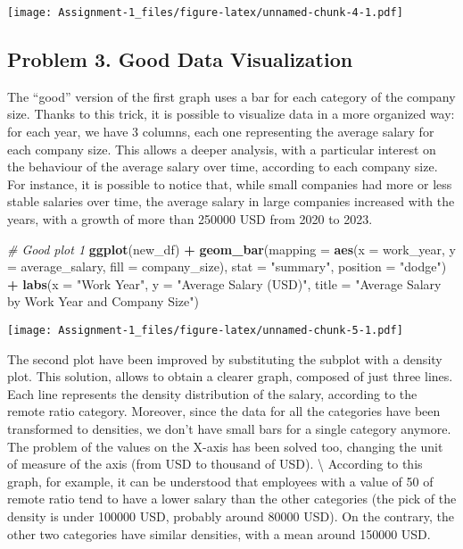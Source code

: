 \documentclass[
]{article}
\newenvironment{Shaded}{\begin{snugshade}}{\end{snugshade}}
\newcommand{\AttributeTok}[1]{\textcolor[rgb]{0.13,0.29,0.53}{#1}}
\newcommand{\CommentTok}[1]{\textcolor[rgb]{0.56,0.35,0.01}{\textit{#1}}}
\newcommand{\FunctionTok}[1]{\textcolor[rgb]{0.13,0.29,0.53}{\textbf{#1}}}
\newcommand{\NormalTok}[1]{#1}
\newcommand{\SpecialCharTok}[1]{\textcolor[rgb]{0.81,0.36,0.00}{\textbf{#1}}}
\newcommand{\StringTok}[1]{\textcolor[rgb]{0.31,0.60,0.02}{#1}}
\begin{document}
\texttt{[image: Assignment-1\_files/figure-latex/unnamed-chunk-4-1.pdf]}

\hypertarget{problem-3.-good-data-visualization}{%
\subsection{Problem 3. Good Data
Visualization}\label{problem-3.-good-data-visualization}}

The ``good'' version of the first graph uses a bar for each category of
the company size. Thanks to this trick, it is possible to visualize data
in a more organized way: for each year, we have 3 columns, each one
representing the average salary for each company size. This allows a
deeper analysis, with a particular interest on the behaviour of the
average salary over time, according to each company size. For instance,
it is possible to notice that, while small companies had more or less
stable salaries over time, the average salary in large companies
increased with the years, with a growth of more than 250000 USD from
2020 to 2023. \newline

\begin{Shaded}
\begin{Highlighting}[]
\CommentTok{\# Good plot 1}
\FunctionTok{ggplot}\NormalTok{(new\_df) }\SpecialCharTok{+}
  \FunctionTok{geom\_bar}\NormalTok{(}\AttributeTok{mapping =} \FunctionTok{aes}\NormalTok{(}\AttributeTok{x =}\NormalTok{ work\_year, }\AttributeTok{y =}\NormalTok{ average\_salary, }\AttributeTok{fill =}\NormalTok{ company\_size), }
           \AttributeTok{stat =} \StringTok{"summary"}\NormalTok{, }\AttributeTok{position =} \StringTok{"dodge"}\NormalTok{) }\SpecialCharTok{+} 
  \FunctionTok{labs}\NormalTok{(}\AttributeTok{x =} \StringTok{"Work Year"}\NormalTok{, }\AttributeTok{y =} \StringTok{"Average Salary (USD)"}\NormalTok{, }\AttributeTok{title =} \StringTok{"Average Salary by Work Year and Company Size"}\NormalTok{)}
\end{Highlighting}
\end{Shaded}

\texttt{[image: Assignment-1\_files/figure-latex/unnamed-chunk-5-1.pdf]}

\newline

The second plot have been improved by substituting the subplot with a
density plot. This solution, allows to obtain a clearer graph, composed
of just three lines. Each line represents the density distribution of
the salary, according to the remote ratio category. Moreover, since the
data for all the categories have been transformed to densities, we don't
have small bars for a single category anymore. The problem of the values
on the X-axis has been solved too, changing the unit of measure of the
axis (from USD to thousand of USD). \textbackslash{} According to this
graph, for example, it can be understood that employees with a value of
50 of remote ratio tend to have a lower salary than the other categories
(the pick of the density is under 100000 USD, probably around 80000
USD). On the contrary, the other two categories have similar densities,
with a mean around 150000 USD. \newline
\end{document}
